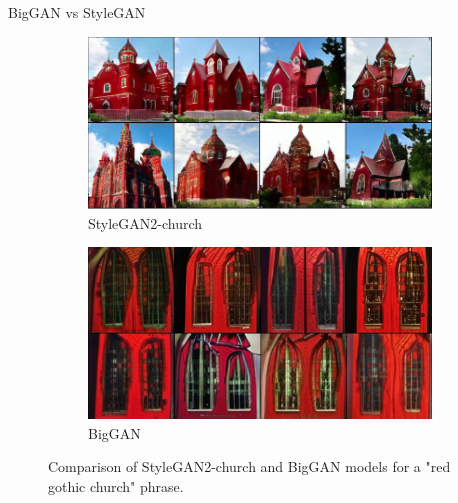 \documentclass[t]{beamer}
\begin{document}
\begin{frame}[c]{BigGAN vs StyleGAN}
\begin{figure}[H]
\centering
\begin{subfigure}[b]{0.6\textwidth}
   \includegraphics[width=1\linewidth, scale=0.2]{redgothic_stylegan.PNG}
   \caption{StyleGAN2-church}
   \label{fig:Ng1} 
\end{subfigure}

\begin{subfigure}[b]{0.6\textwidth}
   \includegraphics[width=1\linewidth, scale=0.2]{redgothic_biggan.PNG}
   \caption{BigGAN}
   \label{fig:Ng2}
\end{subfigure}
\caption[pics]{Comparison of StyleGAN2-church and BigGAN models for a "red gothic church" phrase.}
\end{figure}
\end{frame}
\end{document}
